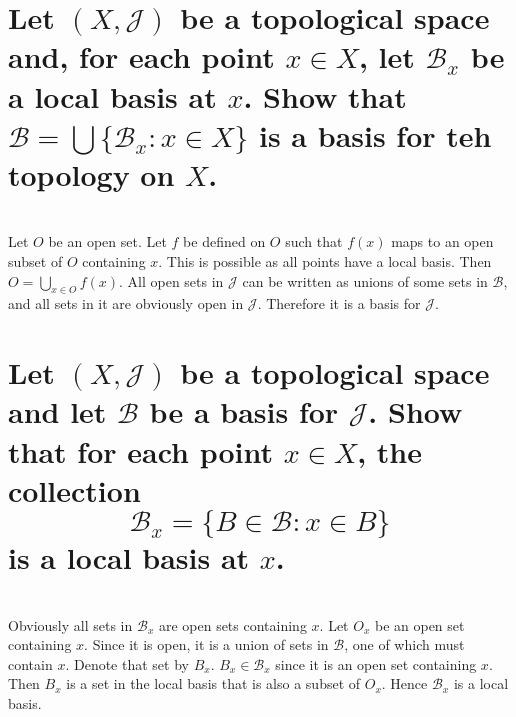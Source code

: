 \begin{parts}
 \part{Let $(X, \mathcal{J})$ be a topological space and, for each point $x \in X$, let $\mathcal{B}_x$ be a local basis at $x$. Show that $\mathcal{B} = \bigcup \{\mathcal{B}_x:x \in X\}$ is a basis for teh topology on $X$.}
 
\begin{solution}
\\ Let $O$ be an open set. Let $f$ be defined on $O$ such that $f(x)$ maps to an open subset of $O$ containing $x$. This is possible as all points have a local basis. Then $O = \bigcup_{x \in O} f(x)$. All open sets in $\mathcal{J}$ can be written as unions of some sets in $\mathcal{B}$, and all sets in it are obviously open in $\mathcal{J}$. Therefore it is a basis for $\mathcal{J}$.
 \end{solution}
 
 \part{Let $(X, \mathcal{J})$ be a topological space and let $\mathcal{B}$ be a basis for $\mathcal{J}$. Show that for each point $x \in X$, the collection $$\mathcal{B}_x = \{B \in \mathcal{B}: x \in B\}$$ is a local basis at $x$.}
 
\begin{solution}
 \\Obviously all sets in $\mathcal{B}_x$ are open sets containing $x$. Let $O_x$ be an open set containing $x$. Since it is open, it is a union of sets in $\mathcal{B}$, one of which must contain $x$. Denote that set by $B_x$. $B_x \in \mathcal{B}_x$ since it is an open set containing $x$. Then $B_x$ is a set in the local basis that is also a subset of $O_x$. Hence $\mathcal{B}_x$ is a local basis.
\end{solution}
 \end{parts}